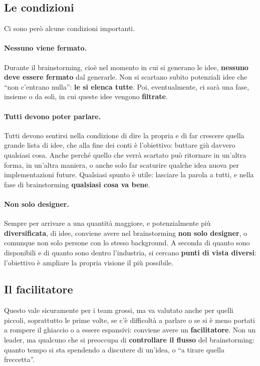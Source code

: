 \subsection{Le condizioni}

Ci sono però alcune condizioni importanti.

\paragraph{Nessuno viene fermato.} Durante il brainstorming, cioè nel momento
in cui si generano le idee, \textbf{nessuno deve essere fermato} dal
generarle. Non si scartano subito potenziali idee che ``non c'entrano
nulla'': \textbf{le si elenca tutte}. Poi, eventualmente, ci sarà una fase,
insieme o da soli, in cui queste idee vengono \textbf{filtrate}.

\paragraph{Tutti devono poter parlare.} Tutti devono sentirsi nella
condizione di dire la propria e di far crescere quella grande lista di idee,
che alla fine dei conti è l'obiettivo: buttare giù davvero qualsiasi cosa.
Anche perché quello che verrà scartato può ritornare in un'altra forma, in
un'altra maniera, o anche solo far scaturire qualche idea nuova per
implementazioni future. Qualsiasi spunto è utile: lasciare la parola a
tutti, e nella fase di brainstorming \textbf{qualsiasi cosa va bene}.

\paragraph{Non solo designer.} Sempre per arrivare a una quantità maggiore,
e potenzialmente più \textbf{diversificata}, di idee, conviene avere nel
brainstorming \textbf{non solo designer}, o comunque non solo persone con lo
stesso background. A seconda di quanto sono disponibili e di quanto sono
dentro l'industria, si cercano \textbf{punti di vista diversi}: l'obiettivo è
ampliare la propria visione il più possibile.

\subsection{Il facilitatore}

Questo vale sicuramente per i team grossi, ma va valutato anche per quelli
piccoli, soprattutto le prime volte, se c'è difficoltà a parlare o se si è
meno portati a rompere il ghiaccio o a essere espansivi: conviene avere un
\textbf{facilitatore}. Non un leader, ma qualcuno che si preoccupa di
\textbf{controllare il flusso} del brainstorming: quanto tempo si sta
spendendo a discutere di un'idea, o ``a tirare quella freccetta''.

